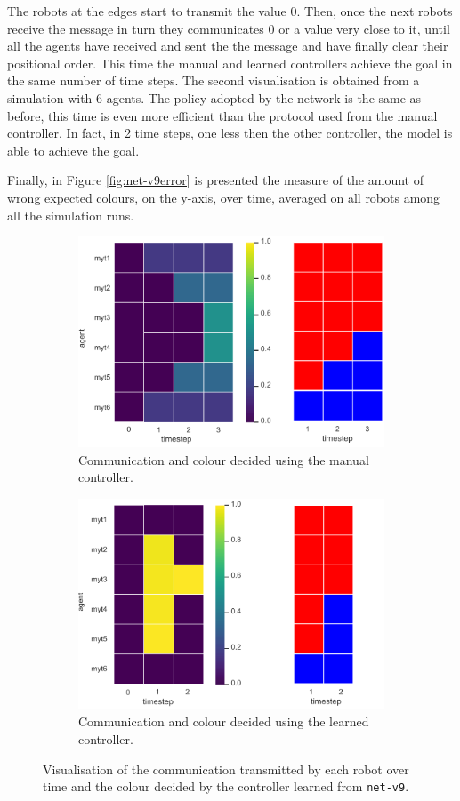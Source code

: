 The robots at the edges start to transmit the value 0. Then, once 
the next robots receive the message in turn they communicates 0 or a value very 
close to it, until all the agents have received and sent the the message and have 
finally clear their positional order.
This time the manual and learned controllers achieve the goal in the same 
number of time steps.
The second visualisation is obtained from a simulation with 6 agents. 
The policy adopted by the network is the same as before, this time is even more 
efficient than the protocol used from the manual controller. In fact, in 2 time 
steps, one less then the other controller, the model is able to achieve the goal.

Finally, in Figure \ref{fig:net-v9error} is presented the measure of the amount of 
wrong expected colours, on the y-axis, over time, averaged on all robots among 
all the simulation runs. 

\begin{figure}[!htb]
	\begin{subfigure}[h]{\textwidth}
		\centering
		\includegraphics[width=.5\textwidth]{contents/images/net-v9/net-v9-manual-1}
		\caption{Communication and colour decided using the manual controller.}
	\end{subfigure}
	\hspace*{\fill}%
	\vspace*{8pt}%
	\hspace*{\fill}%
	\begin{subfigure}[h]{\textwidth}
		\centering			
		\includegraphics[width=.5\textwidth]{contents/images/net-v9/net-v9-learned-1}
		\caption{Communication and colour decided using the learned controller.}
	\end{subfigure}
	\caption[Evaluation of the communication learned by 
	\texttt{net-v9}.]{Visualisation of the communication transmitted by each 
		robot over time and the colour decided by the controller learned from 
		\texttt{net-v9}.}	
	\label{fig:net-v9commcolour2}
\end{figure}

